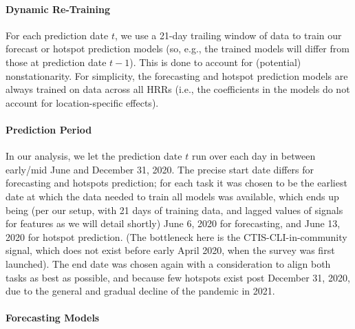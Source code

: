 \documentclass[9pt,twocolumn,twoside,lineno]{pnas-new}
\begin{document}
\paragraph{Dynamic Re-Training}

For each prediction date $t$, we use a 21-day trailing window of data to train
our forecast or hotspot prediction models (so, e.g., the trained models will
differ from those at prediction date $t-1$).  This is done to account for
(potential) nonstationarity.  For simplicity, the forecasting and hotspot
prediction models are always trained on data across all HRRs (i.e., the
coefficients in the models do not account for location-specific effects).   

\paragraph{Prediction Period}

In our analysis, we let the prediction date $t$ run over each day in between
early/mid June and December 31, 2020.  The precise start date differs for 
forecasting and hotspots prediction; for each task it was chosen to be the
earliest date at which the data needed to train all models was available, which
ends up being (per our setup, with 21 days of training data, and lagged values
of signals for features as we will detail shortly) June 6, 2020 for forecasting,
and June 13, 2020 for hotspot prediction. (The bottleneck here is the
CTIS-CLI-in-community signal, which does not exist before early April 2020, when
the survey was first launched). The end date was chosen again with a
consideration to align both tasks as best as possible, and because few hotspots
exist post December 31, 2020, due to the general and gradual decline of the
pandemic in 2021.

\paragraph{Forecasting Models}
\end{document}
